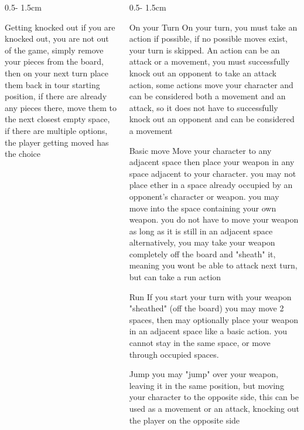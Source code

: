 \documentclass{uioposter}
\begin{document}
\begin{frame}
\begin{columns}[onlytextwidth]
\begin{column}{0.5\textwidth - 1.5cm}
    \begin{block}{Getting knocked out}
        if you are knocked out, you are not out of the game, simply remove your pieces from the board, then on your next turn place them back in tour starting position, if there are already any pieces there, move them to the next closest empty space, if there are multiple options, the player getting moved has the choice
    \end{block}

\end{column}


\begin{column}{0.5\textwidth - 1.5cm}

    \begin{block}{On your Turn}
        On your turn, you must take an action if possible, if no possible moves exist, your turn is skipped. An action can be an attack or a movement, you must successfully knock out an opponent to take an attack action, some actions move your character and can be considered both a movement and an attack, so it does not have to successfully knock out an opponent and can be considered a movement
    \end{block}

    \begin{block}{Basic move}
        Move your character to any adjacent space
        then place your weapon in any space adjacent to your character.
        you may not place ether in a space already occupied by an opponent's character or weapon.
        you may move into the space containing your own weapon.
        you do not have to move your weapon as long as it is still in an adjacent space
        alternatively, you may take your weapon completely off the board and "sheath" it, meaning you wont be able to attack next turn, but can take a run action
    \end{block}

    \begin{block}{Run}
        If you start your turn with your weapon "sheathed" (off the board) you may move 2 spaces, then may optionally place your weapon in an adjacent space like a basic action. you cannot stay in the same space, or move through occupied spaces.
    \end{block}

    \begin{block}{Jump}
        you may "jump" over your weapon, leaving it in the same position, but moving your character to the opposite side,
        this can be used as a movement or an attack, knocking out the player on the opposite side
    \end{block}


\end{column}
\end{columns}
\end{frame}
\end{document}
